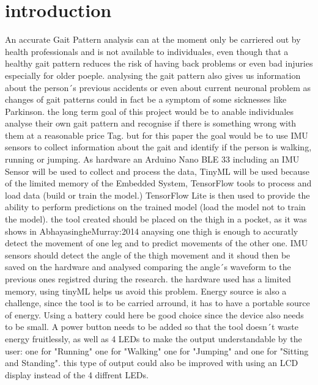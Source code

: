 %
%

\chapter{introduction}
An accurate Gait Pattern analysis can at the moment only be carriered out by health professionals  and is not available to individuales, even though that a healthy gait pattern reduces the risk of having back problems or even bad injuries especially for older poeple. 
analysing the gait pattern also gives us information about the person´s previous accidents or even about current neuronal problem as changes of gait patterns could in fact be a symptom of some sicknesses like Parkinson.
the long term goal of this project would be to anable individuales analyse their own gait pattern and recognise if there is something wrong with them at a reasonable price Tag. 
but for this paper the goal would be to use IMU sensors to collect information about the gait and identify if the person is walking, running or jumping.
As  hardware an Arduino Nano BLE 33  including an IMU Sensor will be used to collect and process the data, TinyML will be used because of the limited memory of the Embedded System, TensorFlow tools to process and load data (build or train the model.) TensorFlow Lite is then used to provide the ability to perform predictions on the trained model (load the model not to train the model). 
the tool created should be placed on the thigh in a pocket, as it was shows in AbhayasingheMurray:2014 anaysing one thigh is enough to accuratly detect the movement of one leg and to predict movements of the other one. IMU sensors should detect the angle of the thigh movement and it shoud then be saved on the hardware and analysed comparing the angle´s waveform to the previous ones registred during the research.
the hardware used has a limited memory, using tinyML helps us avoid this problem. 
Energy source is also a challenge, since the tool is to be carried arround, it has to have a portable source of energy. Using a battery could here be good choice since the device also needs to be small.
A power button needs to be added so that the tool doesn´t waste energy fruitlessly, as well as 4 LEDs to make the output understandable by the user: 
one for "Running" one for "Walking" one for "Jumping"  and one for "Sitting and Standing". this type of output could also be improved with using an LCD display instead of the 4 diffrent LEDs.

